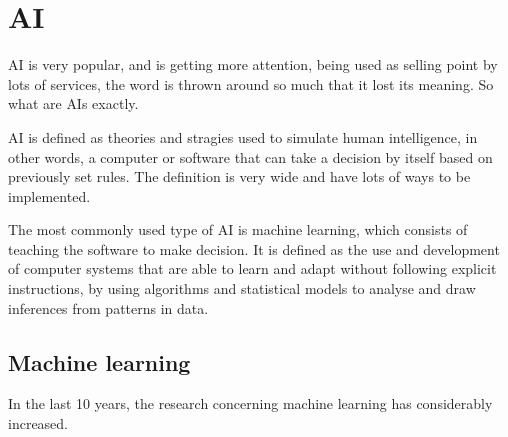 \section{\acl{AI}}\label{sec:ai}

\acf{AI} is very popular, and is getting more attention, being used as selling point by lots of services, the word is thrown around so much that it lost its meaning. So what are \acp{AI} exactly.

\ac{AI} is defined as theories and stragies used to simulate human intelligence, in other words, a computer or software that can take a decision by itself based on previously set rules. The definition is very wide and have lots of ways to be implemented.

The most commonly used type of \ac{AI} is machine learning, which consists of teaching the software to make decision. It is defined as the use and development of computer systems that are able to learn and adapt without following explicit instructions, by using algorithms and statistical models to analyse and draw inferences from patterns in data.

\subsection{Machine learning}

In the last 10 years, the research concerning machine learning has considerably increased.


